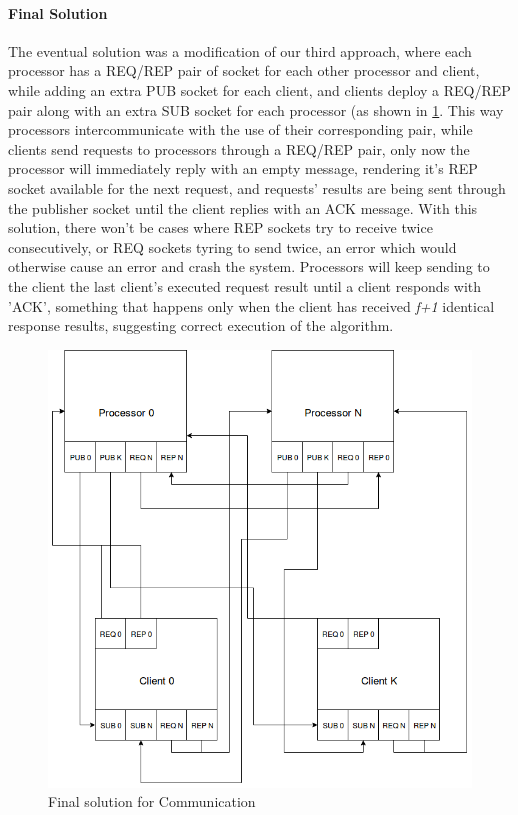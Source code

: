 \documentclass[12pt,a4paper]{report}
\begin{document}
    		    \paragraph{Final Solution}
    		    The eventual solution was a modification of our third approach, where each processor has a REQ/REP pair of socket for each other processor and client, while adding an extra PUB socket for each client, and clients deploy a REQ/REP pair along with an extra SUB socket for each processor (as shown in \ref{fig:finalmessenger}. This way processors intercommunicate with the use of their corresponding pair, while clients send requests to processors through a REQ/REP pair, only now the processor will immediately reply with an empty message, rendering it's REP socket available for the next request, and requests' results are being sent through the publisher socket until the client replies with an ACK message. With this solution, there won't be cases where REP sockets try to receive twice consecutively, or REQ sockets tyring to send twice, an error which would otherwise cause an error and crash the system. Processors will keep sending to the client the last client's executed request result until a client responds with 'ACK', something that happens only when the client has received \textit{f+1} identical response results, suggesting correct execution of the algorithm.
    		    
    		    \begin{figure}
    		        \centering
    		        \includegraphics[scale = 0.5]{ade/finalmessenger.png}
    		        \caption{Final solution for Communication}
    		        \label{fig:finalmessenger}
    		    \end{figure}
    		    		
\end{document}
